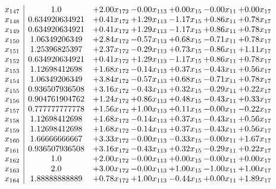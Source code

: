 \documentclass[8pt]{article}
\begin{document}
\[\begin{array}{c| c c@{\hskip 2pt} c@{\hskip 2pt} c@{\hskip 2pt} c@{\hskip 2pt} c@{\hskip 2pt} }
 x_{147}   &  1.0 & +  2.00 x_{172} & -0.00 x_{113} & +  0.00 x_{15} & -0.00 x_{11} & +  0.00 x_{17}\\
 x_{148}   &  0.634920634921 & +  0.41 x_{172} & +  1.29 x_{113} & -1.17 x_{15} & +  0.86 x_{11} & +  0.78 x_{17}\\
 x_{149}   &  0.634920634921 & +  0.41 x_{172} & +  1.29 x_{113} & -1.17 x_{15} & +  0.86 x_{11} & +  0.78 x_{17}\\
 x_{150}   &  1.06349206349 & +  2.84 x_{172} & -0.57 x_{113} & +  0.68 x_{15} & -0.71 x_{11} & +  0.78 x_{17}\\
 x_{151}   &  1.25396825397 & +  2.37 x_{172} & -0.29 x_{113} & +  0.73 x_{15} & -0.86 x_{11} & +  1.11 x_{17}\\
 x_{152}   &  0.634920634921 & +  0.41 x_{172} & +  1.29 x_{113} & -1.17 x_{15} & +  0.86 x_{11} & +  0.78 x_{17}\\
 x_{153}   &  1.12698412698 & +  1.68 x_{172} & -0.14 x_{113} & +  0.37 x_{15} & -0.43 x_{11} & +  0.56 x_{17}\\
 x_{154}   &  1.06349206349 & +  3.84 x_{172} & -0.57 x_{113} & +  0.68 x_{15} & -0.71 x_{11} & +  0.78 x_{17}\\
 x_{155}   &  0.936507936508 & +  3.16 x_{172} & -0.43 x_{113} & +  0.32 x_{15} & -0.29 x_{11} & +  0.22 x_{17}\\
 x_{156}   &  0.904761904762 & +  1.24 x_{172} & +  0.86 x_{113} & +  0.48 x_{15} & -0.43 x_{11} & +  0.33 x_{17}\\
 x_{157}   &  0.777777777778 & +  1.56 x_{172} & +  1.00 x_{113} & +  0.11 x_{15} & -0.00 x_{11} & -0.22 x_{17}\\
 x_{158}   &  1.12698412698 & +  1.68 x_{172} & -0.14 x_{113} & +  0.37 x_{15} & -0.43 x_{11} & +  0.56 x_{17}\\
 x_{159}   &  1.12698412698 & +  1.68 x_{172} & -0.14 x_{113} & +  0.37 x_{15} & -0.43 x_{11} & +  0.56 x_{17}\\
 x_{160}   &  1.66666666667 & +  3.33 x_{172} & -0.00 x_{113} & -0.33 x_{15} & -0.00 x_{11} & +  1.67 x_{17}\\
 x_{161}   &  0.936507936508 & +  3.16 x_{172} & -0.43 x_{113} & +  0.32 x_{15} & -0.29 x_{11} & +  0.22 x_{17}\\
 x_{162}   &  1.0 & +  2.00 x_{172} & -0.00 x_{113} & +  0.00 x_{15} & -0.00 x_{11} & +  0.00 x_{17}\\
 x_{163}   &  2.0 & +  3.00 x_{172} & -0.00 x_{113} & +  1.00 x_{15} & -1.00 x_{11} & +  1.00 x_{17}\\
 x_{164}   &  1.88888888889 & +  0.78 x_{172} & +  1.00 x_{113} & -0.44 x_{15} & +  0.00 x_{11} & +  1.89 x_{17}\\

\end{array}\]
\end{document}
